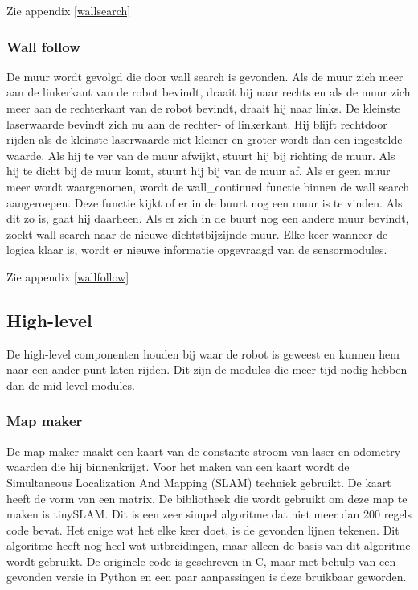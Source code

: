 \documentclass[a4paper,10pt]{article}
\begin{document}
Zie appendix \ref{wallsearch}

\subsubsection{Wall follow}
De muur wordt gevolgd die door wall search is gevonden. Als de muur zich meer aan de linkerkant van de robot bevindt, draait hij naar rechts en als de muur zich meer aan de rechterkant van de robot bevindt, draait hij naar links. De kleinste laserwaarde bevindt zich nu aan de rechter- of linkerkant. Hij blijft rechtdoor rijden als de kleinste laserwaarde niet kleiner en groter wordt dan een ingestelde waarde. Als hij te ver van de muur afwijkt, stuurt hij bij richting de muur. Als hij te dicht bij de muur komt, stuurt hij bij van de muur af. Als er geen muur meer wordt waargenomen, wordt de wall\_continued functie binnen de wall search aangeroepen. Deze functie kijkt of er in de buurt nog een muur is te vinden. Als dit zo is, gaat hij daarheen. Als er zich in de buurt nog een andere muur bevindt, zoekt wall search naar de nieuwe dichtstbijzijnde muur. Elke keer wanneer de logica klaar is, wordt er nieuwe informatie opgevraagd van de sensormodules.

Zie appendix \ref{wallfollow}

\subsection{High-level}
De high-level componenten houden bij waar de robot is geweest en kunnen hem naar een ander punt laten rijden. Dit zijn de modules die meer tijd nodig hebben dan de mid-level modules.

\subsubsection{Map maker}
De map maker maakt een kaart van de constante stroom van laser en odometry waarden die hij binnenkrijgt. Voor het maken van een kaart wordt de Simultaneous Localization And Mapping (SLAM) techniek gebruikt. De kaart heeft de vorm van een matrix.
De bibliotheek die wordt gebruikt om deze map te maken is tinySLAM. Dit is een zeer simpel algoritme dat niet meer dan 200 regels code bevat. Het enige wat het elke keer doet, is de gevonden lijnen tekenen. Dit algoritme heeft nog heel wat uitbreidingen, maar alleen de basis van dit algoritme wordt gebruikt. De originele code is geschreven in C, maar met behulp van een gevonden versie in Python en een paar aanpassingen is deze bruikbaar geworden.
\end{document}
